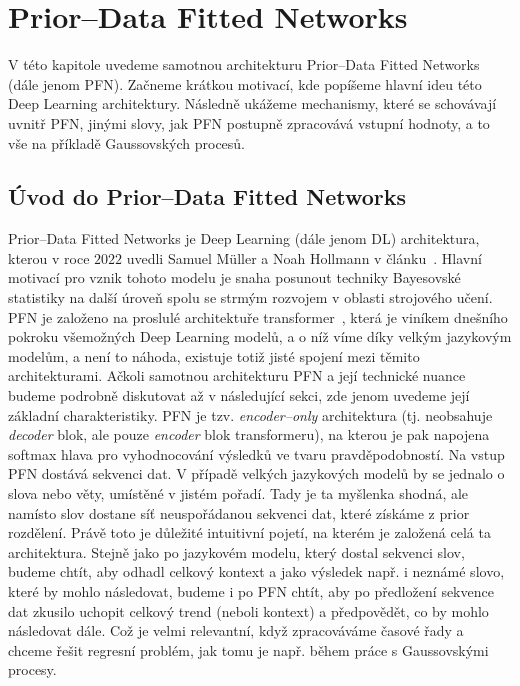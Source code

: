 \chapter{Prior–Data Fitted Networks}
\label{chap:pfn}


V této kapitole uvedeme samotnou architekturu Prior–Data Fitted Networks (dále jenom PFN).
Začneme krátkou motivací, kde popíšeme hlavní ideu této Deep Learning architektury.
Následně ukážeme mechanismy, které se schovávají uvnitř PFN, jinými slovy, jak PFN postupně zpracovává vstupní hodnoty, a to vše na příkladě Gaussovských procesů.

\section{Úvod do Prior–Data Fitted Networks}
\label{sec:pfn-uvod}

Prior–Data Fitted Networks je Deep Learning (dále jenom DL) architektura, kterou v roce $2022$ uvedli Samuel Müller a Noah Hollmann v článku~\cite{muller2022}.
Hlavní motivací pro vznik tohoto modelu je snaha posunout techniky Bayesovské statistiky na další úroveň spolu se strmým rozvojem v oblasti strojového učení. 
PFN je založeno na proslulé architektuře transformer~\cite{vaswani2017}, která je viníkem dnešního pokroku všemožných Deep Learning modelů, a o níž víme díky velkým jazykovým modelům, a není to náhoda, existuje totiž jisté spojení mezi těmito architekturami. 
Ačkoli samotnou architekturu PFN a její technické nuance budeme podrobně diskutovat až v následující sekci, zde jenom uvedeme její základní charakteristiky.
PFN je tzv. \emph{encoder–only} architektura (tj. neobsahuje \emph{decoder} blok, ale pouze \emph{encoder} blok transformeru), na kterou je pak napojena softmax hlava pro vyhodnocování výsledků ve tvaru pravděpodobností.
Na vstup PFN dostává sekvenci dat.
V případě velkých jazykových modelů by se jednalo o slova nebo věty, umístěné v jistém pořadí.
Tady je ta myšlenka shodná, ale namísto slov dostane síť neuspořádanou sekvenci dat, které získáme z prior rozdělení.  
Právě toto je důležité intuitivní pojetí, na kterém je založená celá ta architektura.
Stejně jako po jazykovém modelu, který dostal sekvenci slov, budeme chtít, aby odhadl celkový kontext a jako výsledek např. i neznámé slovo, které by mohlo následovat, budeme i po PFN chtít, aby po předložení sekvence dat zkusilo uchopit celkový trend (neboli kontext) a předpovědět, co by mohlo následovat dále.
Což je velmi relevantní, když zpracováváme časové řady a chceme řešit regresní problém, jak tomu je např. během práce s Gaussovskými procesy.
\par 

